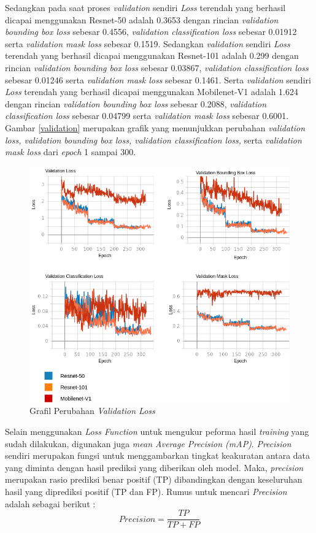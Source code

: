\documentclass[conference]{IEEEtran}
\begin{document}
	Sedangkan pada saat proses \textit{validation} sendiri \textit{Loss} terendah yang berhasil dicapai menggunakan Resnet-50 adalah 0.3653 dengan rincian \textit{validation bounding box loss} sebesar 0.4556, \textit{validation classification loss} sebesar 0.01912 serta \textit{validation mask loss} sebesar 0.1519. Sedangkan \textit{validation} sendiri \textit{Loss} terendah yang berhasil dicapai menggunakan Resnet-101 adalah 0.299 dengan rincian \textit{validation bounding box loss} sebesar 0.03867, \textit{validation classification loss} sebesar 0.01246 serta \textit{validation mask loss} sebesar 0.1461. Serta \textit{validation} sendiri \textit{Loss} terendah yang berhasil dicapai menggunakan Mobilenet-V1 adalah 1.624 dengan rincian \textit{validation bounding box loss} sebesar 0.2088, \textit{validation classification loss} sebesar 0.04799 serta \textit{validation mask loss} sebesar 0.6001. Gambar \ref{validation} merupakan grafik yang menunjukkan perubahan \textit{validation loss, validation bounding box loss, validation classification loss,} serta \textit{validation mask loss} dari \textit{epoch} 1 sampai 300.
	
	\begin{figure}[h]
		\centering
		\includegraphics[scale=0.3]{img/validation.png}
		\caption{Grafil Perubahan \textit{Validation Loss}}
		\label{validation-result}
	\end{figure} 

	Selain menggunakan \textit{Loss Function} untuk mengukur peforma hasil \textit{training} yang sudah dilakukan, digunakan juga \textit{mean Average Precision (mAP)}. \textit{Precision} sendiri merupakan fungsi untuk menggambarkan tingkat keakuratan antara data yang diminta dengan hasil prediksi yang diberikan oleh model. Maka, \textit{precision} merupakan rasio prediksi benar positif (TP) dibandingkan dengan keseluruhan hasil yang diprediksi positif (TP dan FP). Rumus untuk mencari \textit{Precision} adalah sebagai berikut :
	\begin{equation}
		Precision = \frac{TP}{TP+FP} 
	\end{equation}
	
\end{document}
